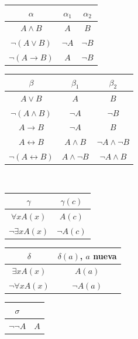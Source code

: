 \begin{center}
\renewcommand{\arraystretch}{1.2}
\begin{tabular}[t]{|c|c|c|}
\hline
$\alpha$ & $\alpha_1$ & $\alpha_2$ \\
\hline
$A \land B$ & $A$ & $B$ \\
$\neg (A \lor B)$ & $\neg A$ & $\neg B$ \\
$\neg (A \to B)$ & $A$ & $\neg B$ \\
\hline
\end{tabular}
\qquad
\begin{tabular}[t]{|c|c|c|}
\hline
$\beta$ & $\beta_1$ & $\beta_2$ \\
\hline
$A \lor B$ & $A$ & $B$ \\
$\neg (A \land B)$ & $\neg A$ & $\neg B$ \\
$A \to B$ & $\neg A$ & $B$ \\
$A \leftrightarrow B$ & $A \land B$ & $\neg A \land \neg B$ \\
$\neg (A \leftrightarrow B)$ & $A \land \neg B$ & $\neg A \land B$ \\
\hline
\end{tabular}
\\[0.4cm]
\begin{tabular}{|c|c|}
\hline
$\gamma$ & $\gamma(c)$ \\
\hline
$\forall x A(x)$ & $A(c)$ \\
$\neg \exists x A(x)$ & $\neg A(c)$ \\
\hline
\end{tabular}
\qquad
\begin{tabular}{|c|c|}
\hline
$\delta$ & $\delta(a)$, $a$ nueva \\
\hline
$\exists x A(x)$ & $A(a)$ \\
$\neg \forall x A(x)$ & $\neg A(a)$ \\
\hline
\end{tabular}
\qquad
\begin{tabular}{|c|c|}
\hline
$\sigma$ & \\
\hline
$\neg\neg A$ & $A$ \\
\hline
\end{tabular}
\end{center}

